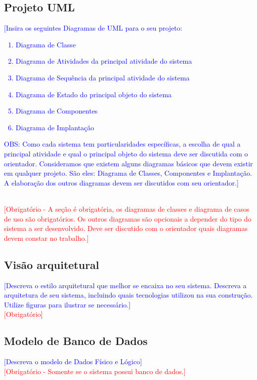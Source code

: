 \documentclass[11pt]{relatorio_tcc_ads_ifba}
\begin{document}
\subsection{Projeto UML}
\textcolor{blue}{
    [Insira os seguintes Diagramas de UML para o seu projeto: 
    \begin{enumerate}
        \item Diagrama de Classe
        \item Diagrama de Atividades da principal atividade do sistema
        \item Diagrama de Sequência da principal atividade do sistema
        \item Diagrama de Estado do principal objeto do sistema
        \item Diagrama de Componentes
        \item Diagrama de Implantação
    \end{enumerate}
    OBS: Como cada sistema tem particularidades específicas, a escolha de qual a principal atividade e qual o principal objeto do sistema deve ser discutida com o orientador. Consideramos que existem alguns diagramas básicos que devem existir em qualquer projeto. São eles: Diagrama de Classes, Componentes e Implantação. A elaboração dos outros diagramas devem ser discutidos com seu orientador.]
} \\
\textcolor{red}{
    [Obrigatório - A seção é obrigatória, os diagramas de classes e diagrama de casos de uso são obrigatórios. Os outros diagramas são opcionais a depender do tipo do sistema a ser desenvolvido. Deve ser discutido com o orientador quais diagramas devem constar no trabalho.]
}

\subsection{Visão arquitetural}
\textcolor{blue}{
    [Descreva o estilo arquitetural que melhor se encaixa no seu sistema. Descreva a arquitetura de seu sistema, incluindo quais tecnologias utilizou na sua construção. Utilize figuras para ilustrar se necessário.]
} \\
\textcolor{red}{[Obrigatório]}

\subsection{Modelo de Banco de Dados}
\textcolor{blue}{
    [Descreva o modelo de Dados Físico e Lógico]
} \\
\textcolor{red}{
    [Obrigatório - Somente se o sistema possui banco de dados.]
}
\end{document}
